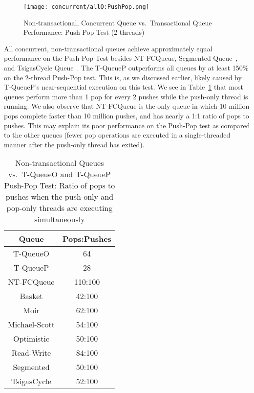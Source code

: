 \begin{figure}[t!]
    \centering
	\begin{minipage}{\textwidth}
        {\texttt{[image: concurrent/allQ:PushPop.png]}}
	\end{minipage}
    \caption{Non-transactional, Concurrent Queue vs.\ Transactional Queue Performance: Push-Pop Test (2 threads)}
    \label{fig:ntqs_pp}
\end{figure}

All concurrent, non-transactional queues achieve approximately equal performance on the Push-Pop Test besides NT-FCQueue, Segmented Queue~\cite{queue4}, and TsigasCycle Queue~\cite{queue5}. 
The T-QueueP outperforms all queues by at least 150\% on the 2-thread Push-Pop test. This is, as we discussed earlier, likely caused by T-QueueP's near-sequential execution on this test. We see in Table~\ref{tab:push_pop_ratio} that most queues perform more than 1 pop for every 2 pushes while the push-only thread is running. We also observe that NT-FCQueue is the only queue in which 10 million pops complete faster than 10 million pushes, and has nearly a 1:1 ratio of pops to pushes. This may explain its poor performance on the Push-Pop test as compared to the other queues (fewer pop operations are executed in a single-threaded manner after the push-only thread has exited).

\begin{table}[t]
        \centering
    \begin{tabular}{|cc|}
        \hline
        Queue & Pops:Pushes\\
        \hline
            T-QueueO & 64\\
            T-QueueP & 28\\
            NT-FCQueue & 110:100\\
            Basket & 42:100\\
            Moir & 62:100\\
            Michael-Scott& 54:100\\
            Optimistic & 50:100\\
            Read-Write & 84:100\\
            Segmented & 50:100\\
            TsigasCycle & 52:100\\
        \hline
    \end{tabular}
    \caption{Non-transactional Queues vs.\ T-QueueO and T-QueueP Push-Pop Test: Ratio of pops to pushes when the push-only and pop-only threads are executing simultaneously}
    \label{tab:push_pop_ratio}
\end{table}

